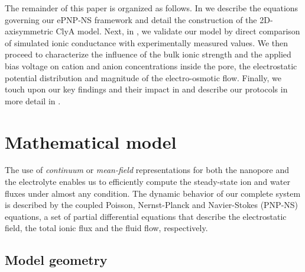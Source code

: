 \documentclass[twoside,twocolumn,9pt]{article}
\begin{document}
The remainder of this paper is organized as follows. In \emph{} we describe the equations
governing our ePNP-NS framework and detail the construction of the 2D-axisymmetric ClyA model. Next, in
\emph{}, we validate our model by direct comparison of simulated ionic conductance with
experimentally measured values. We then proceed to characterize the influence of the bulk ionic strength and
the applied bias voltage on cation and anion concentrations inside the pore, the electrostatic potential
distribution and magnitude of the electro-osmotic flow. Finally, we touch upon our key findings and their
impact in \emph{} and describe our protocols in more detail in
\emph{}.




\section{Mathematical model}\label{sec:model}

The use of \emph{continuum} or \emph{mean-field} representations for both the nanopore and the electrolyte
enables us to efficiently compute the steady-state ion and water fluxes under almost any condition. The
dynamic behavior of our complete system is described by the coupled Poisson, Nernst-Planck and Navier-Stokes
(PNP-NS) equations, a set of partial differential equations that describe the electrostatic field,
the total ionic flux and the fluid flow, respectively.\cite{Eisenberg-1996,Cervera-2005,Lu-2012}

\subsection{Model geometry}\label{sec:geom}
\end{document}
